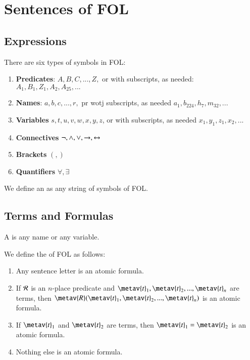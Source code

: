%
%
%
\chapter{Sentences of FOL}
\label{Sent} %

\section{ Expressions}

\begin{definition}
    There are six types of symbols in FOL: \begin{enumerate}
        \item \textbf{Predicates}: $A,B,C,...,Z,$ or with subscripts, as needed: $A_1,B_1,Z_1,A_2,A_{25},...$
        \item \textbf{Names}: $a,b,c,...,r,$ pr wotj subscripts, as needed $a_1,b_{224},h_7,m_{32},...$
        \item \textbf{Variables} $s,t,u,v,w,x,y,z$, or with subscripts, as needed $x_1,y_1,z_1,x_2,...$
        \item \textbf{Connectives} $\neg, \wedge, \vee, \rightarrow, \leftrightarrow$
        \item \textbf{Brackets} $(,)$
        \item \textbf{Quantifiers} $\forall,\exists$
    \end{enumerate}
    We define an  as any string of symbols of FOL.
\end{definition}


\section{ Terms and Formulas}

\begin{definition}
    A  is any name or any variable.
\end{definition}


\begin{definition}
    We define the  of FOL as follows: \begin{enumerate}
        \item Any sentence letter is an atomic formula.
        \item If $\mathcal{R}$ is an $n$-place predicate and $\metav{t}_1,\metav{t}_2,...,\metav{t}_n$ are terms, then $\metav{R}(\metav{t}_1,\metav{t}_2,...,\metav{t}_n)$ is an atomic formula.
        \item If $\metav{t}_1$ and $\metav{t}_2$ are terms, then $\metav{t}_1 = \metav{t}_2$ is an atomic formula.
        \item Nothing else is an atomic formula.
    \end{enumerate}
\end{definition}


